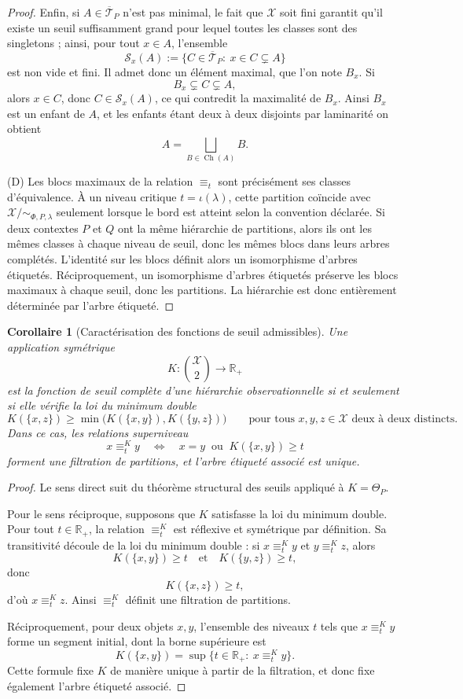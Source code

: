 \documentclass[11pt,a4paper,openany]{book}
\newtheorem{corollary}[definition]{Corollaire}
\begin{document}
\begin{proof}
Enfin, si \(A\in\overline{\mathcal T}_P\) n'est pas minimal, le fait que \(\mathcal X\) soit fini garantit qu'il existe un seuil suffisamment grand pour lequel toutes les classes sont des singletons ; ainsi, pour tout \(x\in A\), l'ensemble
\[
\mathcal S_x(A):=\{C\in\overline{\mathcal T}_P:\ x\in C\subsetneq A\}
\]
est non vide et fini. Il admet donc un élément maximal, que l'on note \(B_x\). Si
\[
B_x\subsetneq C\subsetneq A,
\]
alors \(x\in C\), donc \(C\in\mathcal S_x(A)\), ce qui contredit la maximalité de \(B_x\). Ainsi \(B_x\) est un enfant de \(A\), et les enfants étant deux à deux disjoints par laminarité on obtient
\[
A=\bigsqcup_{B\in\operatorname{Ch}(A)}B.
\]

(D) Les blocs maximaux de la relation \(\equiv_t\) sont précisément ses classes d'équivalence. À un niveau critique \(t=\iota(\lambda)\), cette partition coïncide avec \(\mathcal X/{\sim_{\Phi,P,\lambda}}\) seulement lorsque le bord est atteint selon la convention déclarée. Si deux contextes \(P\) et \(Q\) ont la même hiérarchie de partitions, alors ils ont les mêmes classes à chaque niveau de seuil, donc les mêmes blocs dans leurs arbres complétés. L'identité sur les blocs définit alors un isomorphisme d'arbres étiquetés. Réciproquement, un isomorphisme d'arbres étiquetés préserve les blocs maximaux à chaque seuil, donc les partitions. La hiérarchie est donc entièrement déterminée par l'arbre étiqueté.
\end{proof}

\begin{corollary}[Caractérisation des fonctions de seuil admissibles]
Une application symétrique
\[
K:\binom{\mathcal X}{2}\longrightarrow \mathbb R_+
\]
est la fonction de seuil complète d'une hiérarchie observationnelle si et seulement si elle vérifie la loi du minimum double
\[
K(\{x,z\})\ge \min\bigl(K(\{x,y\}),K(\{y,z\})\bigr)
\qquad
\text{pour tous }x,y,z\in\mathcal X\text{ deux à deux distincts}.
\]
Dans ce cas, les relations superniveau
\[
x\equiv_t^K y
\quad\Longleftrightarrow\quad
x=y\ \text{ ou }\ K(\{x,y\})\ge t
\]
forment une filtration de partitions, et l'arbre étiqueté associé est unique.
\end{corollary}

\begin{proof}
Le sens direct suit du théorème structural des seuils appliqué à \(K=\Theta_P\).

Pour le sens réciproque, supposons que \(K\) satisfasse la loi du minimum double. Pour tout \(t\in\mathbb R_+\), la relation \(\equiv_t^K\) est réflexive et symétrique par définition. Sa transitivité découle de la loi du minimum double : si \(x\equiv_t^K y\) et \(y\equiv_t^K z\), alors
\[
K(\{x,y\})\ge t \quad\text{et}\quad K(\{y,z\})\ge t,
\]
donc
\[
K(\{x,z\})\ge t,
\]
d'où \(x\equiv_t^K z\). Ainsi \(\equiv_t^K\) définit une filtration de partitions.

Réciproquement, pour deux objets \(x,y\), l'ensemble des niveaux \(t\) tels que \(x\equiv_t^K y\) forme un segment initial, dont la borne supérieure est
\[
K(\{x,y\})=\sup\{t\in\mathbb R_+:\ x\equiv_t^K y\}.
\]
Cette formule fixe \(K\) de manière unique à partir de la filtration, et donc fixe également l'arbre étiqueté associé.
\end{proof}
\end{document}
